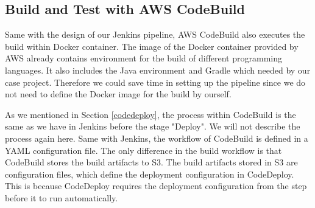 \subsection{Build and Test with AWS CodeBuild}
Same with the design of our Jenkins pipeline, AWS CodeBuild also executes the build within Docker container. The image of the Docker container provided by AWS already contains environment for the build of different programming languages. It also includes the Java environment and Gradle which needed by our case project. Therefore we could save time in setting up the pipeline since we do not need to define the Docker image for the build by ourself.
\par
As we mentioned in Section \ref{codedeploy}, the process within CodeBuild is the same as we have in Jenkins before the stage "Deploy". We will not describe the process again here. Same with Jenkins, the workflow of CodeBuild is defined in a YAML configuration file. The only difference in the build workflow is that CodeBuild stores the build artifacts to S3. The build artifacts stored in S3 are configuration files, which define the deployment configuration in CodeDeploy. This is because CodeDeploy requires the deployment configuration from the step before it to run automatically.

